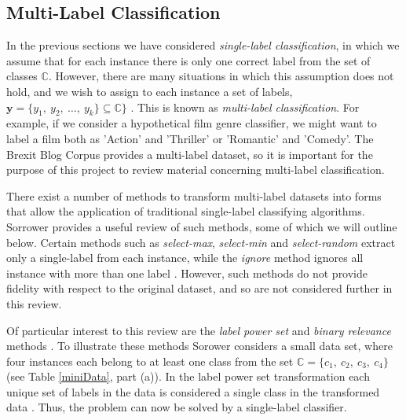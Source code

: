 \documentclass[Dissertation.tex]{subfiles}
\begin{document}
\subsection{Multi-Label Classification}\label{multiLabel}
In the previous sections we have considered \textit{single-label classification}, in which we assume  that for each instance there is only one correct label from the set of classes $ \mathbb{C} $. However, there are many situations in which this assumption does not hold, and we wish to assign to each instance a set of labels, $ \mathbf{y} = \{y_1,\ y_2,\  \dots, \ y_k\} \subseteq \mathbb{C}\} $ \cite{tsoumakasMiningMultilabelData2009}. This is known as \textit{multi-label classification}. For example, if we consider a hypothetical film genre classifier, we might want to label a film both as 'Action' and 'Thriller' or 'Romantic' and 'Comedy'. The Brexit Blog Corpus \cite{simakiAnnotatingSpeakerStance2017} provides a multi-label dataset, so it is important for the purpose of this project to review material concerning multi-label classification.

There exist a number of methods to transform multi-label datasets into forms that allow the application of traditional single-label classifying algorithms. Sorrower \cite{sorowerLiteratureSurveyAlgorithms2018} provides a useful review of such methods, some of which we will outline below. Certain methods such as \textit{select-max}, \textit{select-min} and \textit{select-random} extract only a single-label from each instance, while the \textit{ignore} method ignores all instance with more than one label \cite{sorowerLiteratureSurveyAlgorithms2018}. However, such methods do not provide fidelity with respect to the original dataset, and so are not considered further in this review. 

Of particular interest to this review are the \textit{label power set} and \textit{binary relevance} methods \cite{sorowerLiteratureSurveyAlgorithms2018}. To illustrate these methods Sorower \cite{sorowerLiteratureSurveyAlgorithms2018} considers a small data set, where four instances each belong to at least one class from the set $\mathbb{C} = \{c_1, \ c_2, \ c_3, \ c_4\}$ (see Table \ref{miniData}, part (a)).  In the label power set transformation each unique set of labels in the data is considered a single class in the transformed data \cite{sorowerLiteratureSurveyAlgorithms2018}. Thus, the problem can now be solved by a single-label classifier.
\end{document}
